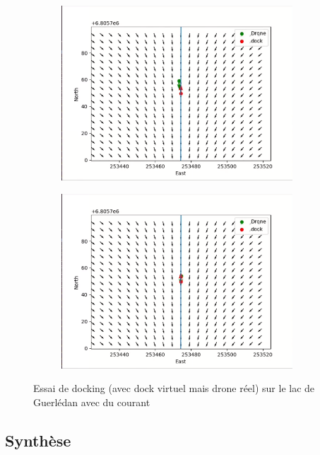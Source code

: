 \documentclass[12pt]{report}
\begin{document}
\begin{figure}[H]
  \begin{subfigure}{0.45\textwidth}
    \centering
    \includegraphics[width=0.95\textwidth]{imgs/drone_exp1_5.png}
    \caption{}
  \end{subfigure}
  \begin{subfigure}{0.45\textwidth}
    \centering
    \includegraphics[width=0.95\textwidth]{imgs/drone_exp1_6.png}
    \caption{}
  \end{subfigure}

  \caption{Essai de docking (avec dock virtuel mais drone réel) sur le lac de Guerlédan avec du courant}
  \label{fig:drone_exp1}
\end{figure}

\subsection{Synthèse}
\end{document}
